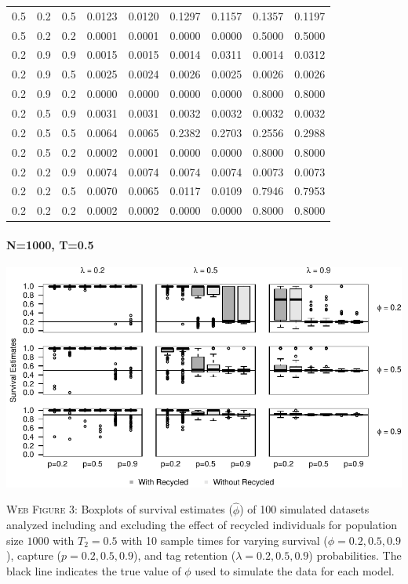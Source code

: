 \documentclass[]{article}
\let\oldparagraph\paragraph
\renewcommand{\paragraph}[1]{\oldparagraph{#1}\mbox{}}
\begin{document}
\begin{table}[ht]
{\begin{tabular}{rrrrrrrrr}
  0.5 & 0.2 & 0.5 & 0.0123 & 0.0120 & 0.1297 & 0.1157 & 0.1357 & 0.1197 \\ 
  0.5 & 0.2 & 0.2 & 0.0001 & 0.0001 & 0.0000 & 0.0000 & 0.5000 & 0.5000 \\ 
  0.2 & 0.9 & 0.9 & 0.0015 & 0.0015 & 0.0014 & 0.0311 & 0.0014 & 0.0312 \\ 
  0.2 & 0.9 & 0.5 & 0.0025 & 0.0024 & 0.0026 & 0.0025 & 0.0026 & 0.0026 \\ 
  0.2 & 0.9 & 0.2 & 0.0000 & 0.0000 & 0.0000 & 0.0000 & 0.8000 & 0.8000 \\ 
  0.2 & 0.5 & 0.9 & 0.0031 & 0.0031 & 0.0032 & 0.0032 & 0.0032 & 0.0032 \\ 
  0.2 & 0.5 & 0.5 & 0.0064 & 0.0065 & 0.2382 & 0.2703 & 0.2556 & 0.2988 \\ 
  0.2 & 0.5 & 0.2 & 0.0002 & 0.0001 & 0.0000 & 0.0000 & 0.8000 & 0.8000 \\ 
  0.2 & 0.2 & 0.9 & 0.0074 & 0.0074 & 0.0074 & 0.0074 & 0.0073 & 0.0073 \\ 
  0.2 & 0.2 & 0.5 & 0.0070 & 0.0065 & 0.0117 & 0.0109 & 0.7946 & 0.7953 \\ 
  0.2 & 0.2 & 0.2 & 0.0002 & 0.0002 & 0.0000 & 0.0000 & 0.8000 & 0.8000 \\ 
   \hline
\end{tabular}
}
\endgroup
\end{table}

\newpage

\paragraph{N=1000, T=0.5}\label{n1000-t0.5}

\includegraphics{Appendix_BW_files/figure-latex/figure3_survival_GJSTL4-1.pdf}

\textsc{Web Figure 3:} Boxplots of survival estimates (\(\hat{\phi}\))
of 100 simulated datasets analyzed including and excluding the effect of
recycled individuals for population size \(1000\) with \(T_2=0.5\) with
10 sample times for varying survival (\(\phi=0.2,0.5,0.9\)), capture
(\(p=0.2,0.5,0.9\)), and tag retention (\(\lambda=0.2,0.5,0.9\))
probabilities. The black line indicates the true value of \(\phi\) used
to simulate the data for each model.
\end{document}
